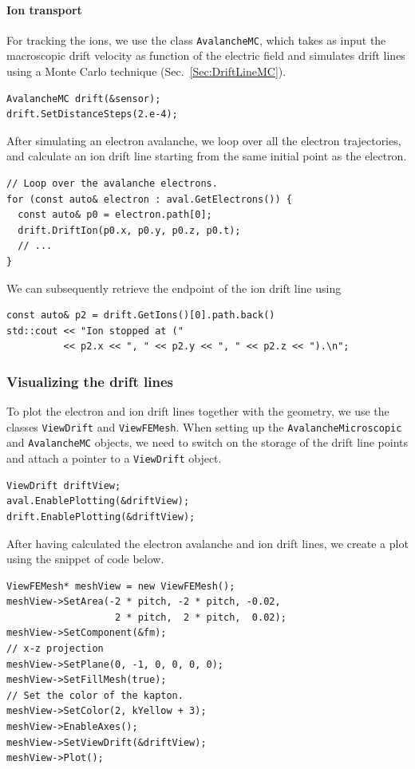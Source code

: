 \paragraph{Ion transport}
For tracking the ions, we use the class \texttt{AvalancheMC}, 
which takes as input the macroscopic drift velocity as 
function of the electric field and simulates drift lines using a 
Monte Carlo technique (Sec.~\ref{Sec:DriftLineMC}).
\begin{lstlisting}
AvalancheMC drift(&sensor);
drift.SetDistanceSteps(2.e-4);
\end{lstlisting}
After simulating an electron avalanche, we loop over all the electron
trajectories, and calculate an ion drift line starting from the same
initial point as the electron.
\begin{lstlisting}
// Loop over the avalanche electrons.
for (const auto& electron : aval.GetElectrons()) {
  const auto& p0 = electron.path[0];
  drift.DriftIon(p0.x, p0.y, p0.z, p0.t);
  // ...
}
\end{lstlisting}
We can subsequently retrieve the endpoint of the ion drift line using
\begin{lstlisting}
const auto& p2 = drift.GetIons()[0].path.back()
std::cout << "Ion stopped at (" 
          << p2.x << ", " << p2.y << ", " << p2.z << ").\n";
\end{lstlisting}
\subsubsection{Visualizing the drift lines}
To plot the electron and ion drift lines together with the geometry, 
we use the classes \texttt{ViewDrift} and \texttt{ViewFEMesh}. 
When setting up the \texttt{AvalancheMicroscopic} and \texttt{AvalancheMC} 
objects, we need to switch on the storage of the drift line points and 
attach a pointer to a \texttt{ViewDrift} object.
\begin{lstlisting}
ViewDrift driftView;
aval.EnablePlotting(&driftView);
drift.EnablePlotting(&driftView);
\end{lstlisting}
After having calculated the electron avalanche and ion drift lines, we create a plot using the snippet of code below.
\begin{lstlisting}
ViewFEMesh* meshView = new ViewFEMesh();
meshView->SetArea(-2 * pitch, -2 * pitch, -0.02,
                   2 * pitch,  2 * pitch,  0.02);
meshView->SetComponent(&fm);
// x-z projection
meshView->SetPlane(0, -1, 0, 0, 0, 0);
meshView->SetFillMesh(true); 
// Set the color of the kapton.
meshView->SetColor(2, kYellow + 3);
meshView->EnableAxes();
meshView->SetViewDrift(&driftView);
meshView->Plot();
\end{lstlisting}
